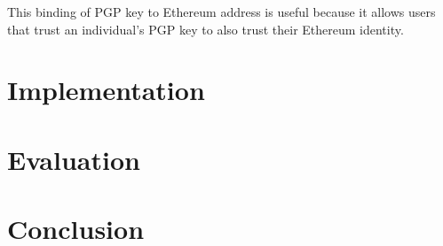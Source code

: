 \documentclass[12pt,a4paper]{report}
\begin{document}
	This binding of PGP key to Ethereum address is useful because it allows users that trust an individual's PGP key to also trust their Ethereum identity.
	
	\chapter{Implementation}
	
	\chapter{Evaluation}
	
	\chapter{Conclusion}
	
	
	
\end{document}
